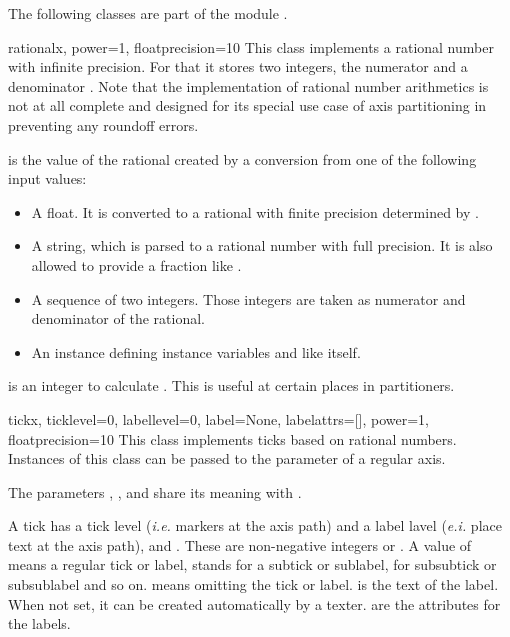 
The following classes are part of the module .

\begin{classdesc}{rational}{x, power=1, floatprecision=10}
  This class implements a rational number with infinite precision. For
  that it stores two integers, the numerator  and a
  denominator . Note that the implementation of rational
  number arithmetics is not at all complete and designed for its
  special use case of axis partitioning in \PyX{} preventing any
  roundoff errors.

   is the value of the rational created by a conversion from
  one of the following input values:
  \begin{itemize}
  \item A float. It is converted to a rational with finite precision
    determined by .
  \item A string, which is parsed to a rational number with full
    precision. It is also allowed to provide a fraction like
    .
  \item A sequence of two integers. Those integers are taken as
    numerator and denominator of the rational.
  \item An instance defining instance variables  and
   like  itself.
  \end{itemize}

   is an integer to calculate .
  This is useful at certain places in partitioners.
\end{classdesc}

\begin{classdesc}{tick}{x, ticklevel=0, labellevel=0, label=None,
                        labelattrs=[], power=1, floatprecision=10}
  This class implements ticks based on rational numbers. Instances of
  this class can be passed to the  parameter of a
  regular axis.

  The parameters , , and  share
  its meaning with .

  A tick has a tick level (\emph{i.e.} markers at the axis path) and a
  label lavel (\emph{e.i.} place text at the axis path),
   and . These are non-negative
  integers or . A value of  means a regular tick or
  label,  stands for a subtick or sublabel,  for
  subsubtick or subsublabel and so on.  means omitting the
  tick or label.  is the text of the label. When not set,
  it can be created automatically by a texter.  are
  the attributes for the labels.
\end{classdesc} %

